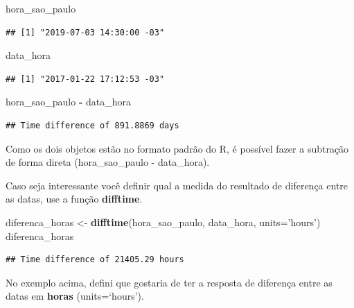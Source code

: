 \documentclass[
]{book}
\newenvironment{Shaded}{\begin{snugshade}}{\end{snugshade}}
\newcommand{\DataTypeTok}[1]{\textcolor[rgb]{0.13,0.29,0.53}{#1}}
\newcommand{\KeywordTok}[1]{\textcolor[rgb]{0.13,0.29,0.53}{\textbf{#1}}}
\newcommand{\NormalTok}[1]{#1}
\newcommand{\OperatorTok}[1]{\textcolor[rgb]{0.81,0.36,0.00}{\textbf{#1}}}
\newcommand{\StringTok}[1]{\textcolor[rgb]{0.31,0.60,0.02}{#1}}
\begin{document}
\begin{Shaded}
\begin{Highlighting}[]
\NormalTok{hora_sao_paulo}
\end{Highlighting}
\end{Shaded}

\begin{verbatim}
## [1] "2019-07-03 14:30:00 -03"
\end{verbatim}

\begin{Shaded}
\begin{Highlighting}[]
\NormalTok{data_hora}
\end{Highlighting}
\end{Shaded}

\begin{verbatim}
## [1] "2017-01-22 17:12:53 -03"
\end{verbatim}

\begin{Shaded}
\begin{Highlighting}[]
\NormalTok{hora_sao_paulo }\OperatorTok{-}\StringTok{ }\NormalTok{data_hora}
\end{Highlighting}
\end{Shaded}

\begin{verbatim}
## Time difference of 891.8869 days
\end{verbatim}

Como os dois objetos estão no formato padrão do R, é possível fazer a
subtração de forma direta (hora\_sao\_paulo - data\_hora).

Caso seja interessante você definir qual a medida do resultado de
diferença entre as datas, use a função \textbf{difftime}.

\begin{Shaded}
\begin{Highlighting}[]
\NormalTok{diferenca_horas <-}\StringTok{ }\KeywordTok{difftime}\NormalTok{(hora_sao_paulo, data_hora, }\DataTypeTok{units=}\StringTok{'hours'}\NormalTok{)}
\NormalTok{diferenca_horas}
\end{Highlighting}
\end{Shaded}

\begin{verbatim}
## Time difference of 21405.29 hours
\end{verbatim}

No exemplo acima, defini que gostaria de ter a resposta de diferença
entre as datas em \textbf{horas} (units=`hours').
\end{document}
